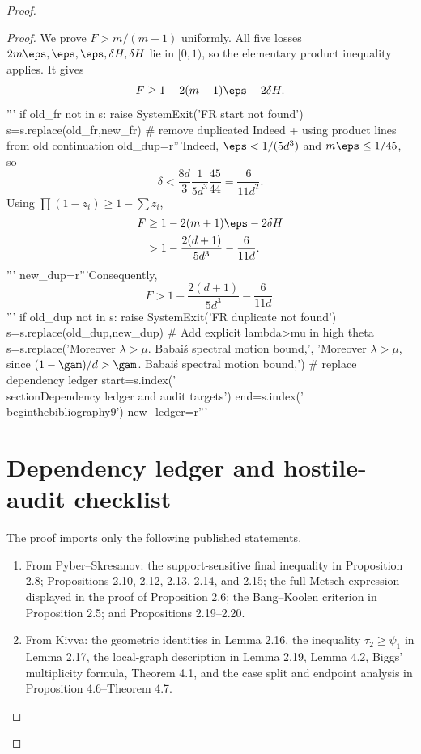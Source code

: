 \begin{proof}
\begin{proof}
We prove $F>m/(m+1)$ uniformly.  All five losses
$2m\eps,\eps,\eps,\delta H,\delta H$ lie in $[0,1)$, so the elementary product inequality applies.  It gives
\[
 F\ge1-2(m+1)\eps-2\delta H.
\]'''
if old_fr not in s:
    raise SystemExit('FR start not found')
s=s.replace(old_fr,new_fr)
# remove duplicated Indeed + using product lines from old continuation
old_dup=r'''Indeed, $\eps<1/(5d^3)$ and $m\eps\le1/45$, so
\[
 \delta<\frac{8d}{3}\frac1{5d^3}\frac{45}{44}
 =\frac6{11d^2}.
\]
Using $\prod(1-z_i)\ge1-\sum z_i$,
\begin{align*}
 F
 &\ge1-2(m+1)\eps-2\delta H\\
 &>1-\frac{2(d+1)}{5d^3}-\frac6{11d}.
\end{align*}'''
new_dup=r'''Consequently,
\[
 F>1-\frac{2(d+1)}{5d^3}-\frac6{11d}.
\]'''
if old_dup not in s:
    raise SystemExit('FR duplicate not found')
s=s.replace(old_dup,new_dup)
# Add explicit lambda>mu in high theta
s=s.replace('Moreover $\lambda>\mu$.  Babai\'s spectral motion bound,',
            'Moreover $\lambda>\mu$, since $(1-\gam)/d>\gam$.  Babai\'s spectral motion bound,')
# replace dependency ledger
start=s.index('\\section{Dependency ledger and audit targets}')
end=s.index('\\begin{thebibliography}{9}')
new_ledger=r'''\section{Dependency ledger and hostile-audit checklist}
The proof imports only the following published statements.
\begin{enumerate}[leftmargin=2.2em,itemsep=0.35em]
\item From Pyber--Skresanov: the support-sensitive final inequality in Proposition 2.8; Propositions 2.10, 2.12, 2.13, 2.14, and 2.15; the full Metsch expression displayed in the proof of Proposition 2.6; the Bang--Koolen criterion in Proposition 2.5; and Propositions 2.19--2.20.
\item From Kivva: the geometric identities in Lemma 2.16, the inequality $\tau_2\ge\psi_1$ in Lemma 2.17, the local-graph description in Lemma 2.19, Lemma 4.2, Biggs' multiplicity formula, Theorem 4.1, and the case split and endpoint analysis in Proposition 4.6--Theorem 4.7.
\end{enumerate}


\end{proof}
\end{proof}
